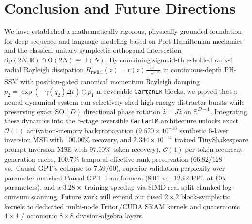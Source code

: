 \documentclass[11pt,a4paper]{article}
\begin{document}
\section{Conclusion and Future Directions}
\label{sec:conclusion}

We have established a mathematically rigorous, physically grounded foundation for deep sequence and language modeling based on Port-Hamiltonian mechanics and the classical unitary-symplectic-orthogonal intersection $\mathrm{Sp}(2N,\mathbb{R})\cap \mathrm{O}(2N) \cong \mathrm{U}(N)$. By combining sigmoid-thresholded rank-1 radial Rayleigh dissipation $R_{\text{radial}}(z) = r(z)\frac{zz^\top}{\|z\|^2}$ in continuous-depth PH-SSM with position-gated canonical momentum Rayleigh damping $p_2 = \exp(-\gamma(q_2)\Delta t)\odot p_1$ in reversible \texttt{CartanLM} blocks, we proved that a neural dynamical system can selectively shed high-energy distractor bursts while preserving exact $\mathrm{SO}(D)$ directional phase rotation $\dot{\hat{z}} = J\hat{z}$ on $\mathbb{S}^{D-1}$. Integrating these dynamics into the 5-stage reversible \texttt{CartanLM} architecture unlocks exact $\mathcal{O}(1)$ activation-memory backpropagation ($9.520\times 10^{-16}$ synthetic 6-layer inversion MSE with $100.00\%$ recovery, and $2.344\times 10^{-14}$ trained TinyShakespeare prompt inversion MSE with $97.50\%$ token recovery), $\mathcal{O}(1)$ per-token recurrent generation cache, $100.7\%$ temporal effective rank preservation ($66.82/128$ vs.\ Causal GPT's collapse to $7.59/60$), superior validation perplexity over parameter-matched Causal GPT Transformers ($8.01$ vs.\ $12.92$ PPL at $60\text{k}$ parameters), and a $3.28\times$ training speedup via SIMD real-split chunked log-cumsum scanning. Future work will extend our fused $2\times 2$ block-symplectic kernels to dedicated multi-node Triton/CUDA SRAM kernels and quaternionic $4\times 4$ / octonionic $8\times 8$ division-algebra layers.

\vspace{0.8em}


\end{document}
